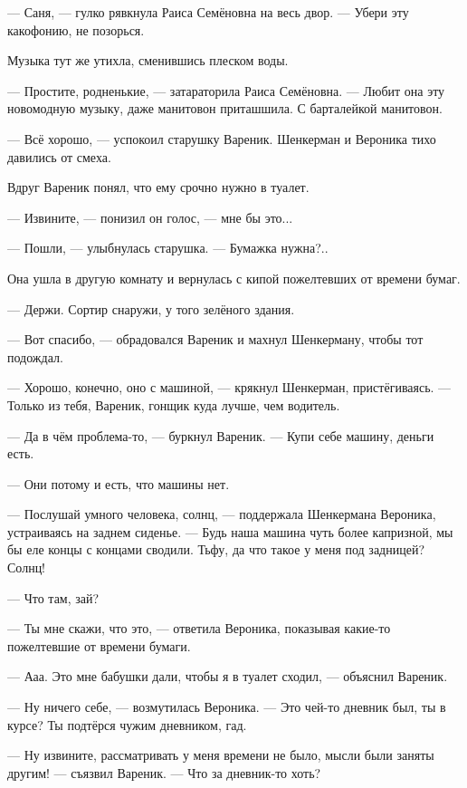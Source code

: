 --- Саня, --- гулко рявкнула Раиса Семёновна на весь двор.
--- Убери эту какофонию, не позорься.

Музыка тут же утихла, сменившись плеском воды.

--- Простите, родненькие, --- затараторила Раиса Семёновна.
--- Любит она эту новомодную музыку, даже манитовон приташшила.
С барталейкой манитовон.

--- Всё хорошо, --- успокоил старушку Вареник.
Шенкерман и Вероника тихо давились от смеха.

\asterism

\textspace

Вдруг Вареник понял, что ему срочно нужно в туалет.

--- Извините, --- понизил он голос, --- мне бы это...

--- Пошли, --- улыбнулась старушка.
--- Бумажка нужна?..

Она ушла в другую комнату и вернулась с кипой пожелтевших от времени бумаг.

--- Держи.
Сортир снаружи, у того зелёного здания.

--- Вот спасибо, --- обрадовался Вареник и махнул Шенкерману, чтобы тот подождал.

\textspace

\asterism

\textspace

--- Хорошо, конечно, оно с машиной, --- крякнул Шенкерман, пристёгиваясь.
--- Только из тебя, Вареник, гонщик куда лучше, чем водитель.

--- Да в чём проблема-то, --- буркнул Вареник.
--- Купи себе машину, деньги есть.

--- Они потому и есть, что машины нет.

--- Послушай умного человека, солнц, --- поддержала Шенкермана Вероника, устраиваясь на заднем сиденье.
--- Будь наша машина чуть более капризной, мы бы еле концы с концами сводили.
Тьфу, да что такое у меня под задницей?
Солнц!

--- Что там, зай?

--- Ты мне скажи, что это, --- ответила Вероника, показывая какие-то пожелтевшие от времени бумаги.

--- Ааа.
Это мне бабушки дали, чтобы я в туалет сходил, --- объяснил Вареник.

--- Ну ничего себе, --- возмутилась Вероника.
--- Это чей-то дневник был, ты в курсе?
Ты подтёрся чужим дневником, гад.

--- Ну извините, рассматривать у меня времени не было, мысли были заняты другим! --- съязвил Вареник.
--- Что за дневник-то хоть?

